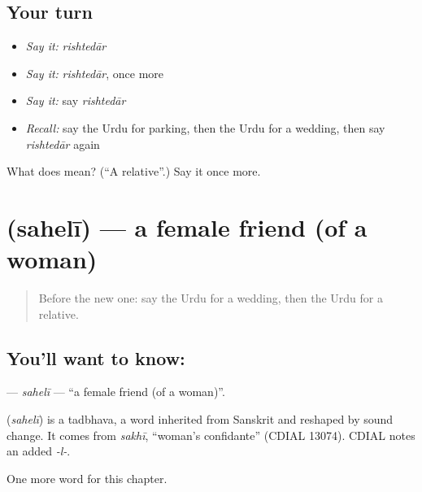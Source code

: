 \subsection*{Your turn}
\begin{itemize}
\raggedright
  \item \emph{Say it:} \emph{rishtedār}
  \item \emph{Say it:} \emph{rishtedār}, once more
  \item \emph{Say it:} say \emph{rishtedār}
  \item \emph{Recall:} say the Urdu for parking, then the Urdu for a wedding, then say \emph{rishtedār} again
\end{itemize}

\begin{tcolorbox}[breakable,colback=teal!4,colframe=teal!35!black,title={Before you move on}]
What does   mean? (\textquotedblleft{}A relative\textquotedblright{}.) Say it once more.
\end{tcolorbox}
\section[\texorpdfstring{\ur{سہیلی} (sahelī)}{سہیلی (sahelī)}]{ (sahelī) — a female friend (of a woman)}

\label{lesson:UR-C256-saheli}



\begin{quote}
Before the new one: say the Urdu for a wedding, then the Urdu for a relative.
\end{quote}

\subsection*{You'll want to know: }
\textbf{} — \emph{sahelī} — \textquotedblleft{}a female friend (of a woman)\textquotedblright{}.

\begin{cousinweb}
\textbf{} (\emph{sahelī}) is a tadbhava, a word inherited from Sanskrit and reshaped by sound change. It comes from \emph{sakhī}, \textquotedblleft{}woman's confidante\textquotedblright{} (CDIAL 13074). CDIAL notes an added \emph{-l-}.
\end{cousinweb}

\begin{grammarlens}[title={What you've built}]
One more word for this chapter.
\end{grammarlens}

